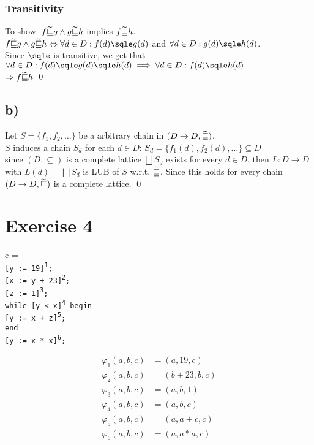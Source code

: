 \documentclass[fleqn,12pt]{article}
\begin{document}
\subsubsection*{Transitivity}
To show: $f \widetilde\sqsubseteq g \land g \widetilde\sqsubseteq h$ implies $f \widetilde\sqsubseteq h$.\\
$f \sqt g \land g \sqt h \Leftrightarrow \forall d \in D: f(d) \sqle g(d)$ and $\forall d \in D: g(d) \sqle h(d)$.\\
Since $\sqle$ is transitive, we get that\\
$ \forall d \in D: f(d) \sqle g(d) \sqle h(d) \implies \forall d \in D: f(d) \sqle h(d)$\\
$\Rightarrow f \widetilde\sqsubseteq h$
\qed

\subsection*{b)}
Let $S= \{f_1, f_2, \dots\}$ be a arbitrary chain in $(D \rightarrow D, \widetilde\sqsubseteq)$.\\
$S$ induces a chain $S_d$ for each $d \in D$:
$S_d = \{f_1(d), f_2(d), \dots\} \subseteq D$\\
since $(D, \subseteq)$ is a complete lattice $\bigsqcup S_d$ exists for every $d \in D$, 
then $L: D \rightarrow D$ with $L(d) =\bigsqcup S_d$ is LUB of $S$ w.r.t. $\widetilde\sqsubseteq$.
Since this holds for every chain $(D \rightarrow D, \widetilde\sqsubseteq)$ is a complete lattice. \qed


\section*{Exercise 4}
\newcommand\ein{\leavevmode{\parindent=1em\indent}}
\newcommand\cst[2]{\texttt{[#1]\textsuperscript{#2}}}
\newcommand\cli[2]{\cst{#1}{#2}\texttt{;}\\}

\vbox{c = \\
\cli{y := 19}{1}
\cli{x := y + 23}{2}
\cli{z := 1}{3}
\texttt{while \cst{y < x}{4} begin}\\
\ein \cli{y := x + z}{5}
\texttt{end}\\
\cli{y := x * x}{6}}

\begin{align*}
	\varphi_1(a,b,c) &= (a, 19, c)\\
	\varphi_2(a,b,c) &= (b+23, b, c)\\
	\varphi_3(a,b,c) &= (a, b, 1)\\
	\varphi_4(a,b,c) &= (a, b, c)\\
	\varphi_5(a,b,c) &= (a, a+c, c)\\
	\varphi_6(a,b,c) &= (a, a*a, c)\\
\end{align*}
\end{document}

